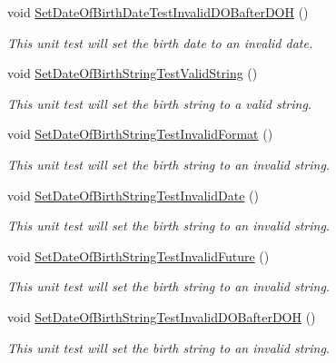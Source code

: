 \begin{DoxyCompactItemize}
void \hyperlink{class_my_all_employee_1_1_tests_1_1_full_time_employee_tests_a55349b1b82a2fa2317cfc5264117c39b}{Set\+Date\+Of\+Birth\+Date\+Test\+Invalid\+D\+O\+Bafter\+D\+O\+H} ()
\begin{DoxyCompactList}\small\item\em This unit test will set the birth date to an invalid date. \end{DoxyCompactList}\item 
void \hyperlink{class_my_all_employee_1_1_tests_1_1_full_time_employee_tests_a67f757b32c290ae433884bce57e33654}{Set\+Date\+Of\+Birth\+String\+Test\+Valid\+String} ()
\begin{DoxyCompactList}\small\item\em This unit test will set the birth string to a valid string. \end{DoxyCompactList}\item 
void \hyperlink{class_my_all_employee_1_1_tests_1_1_full_time_employee_tests_acea46d71cc386e8f83ec2d8d14e2e0ba}{Set\+Date\+Of\+Birth\+String\+Test\+Invalid\+Format} ()
\begin{DoxyCompactList}\small\item\em This unit test will set the birth string to an invalid string. \end{DoxyCompactList}\item 
void \hyperlink{class_my_all_employee_1_1_tests_1_1_full_time_employee_tests_a42006f31a8eef0684f11d335ce47d8c8}{Set\+Date\+Of\+Birth\+String\+Test\+Invalid\+Date} ()
\begin{DoxyCompactList}\small\item\em This unit test will set the birth string to an invalid string. \end{DoxyCompactList}\item 
void \hyperlink{class_my_all_employee_1_1_tests_1_1_full_time_employee_tests_a41513d1b83b5cc8380c5cd19d0ef45d7}{Set\+Date\+Of\+Birth\+String\+Test\+Invalid\+Future} ()
\begin{DoxyCompactList}\small\item\em This unit test will set the birth string to an invalid string. \end{DoxyCompactList}\item 
void \hyperlink{class_my_all_employee_1_1_tests_1_1_full_time_employee_tests_accc07c2a05da5a5c28d570cfc8a90bda}{Set\+Date\+Of\+Birth\+String\+Test\+Invalid\+D\+O\+Bafter\+D\+O\+H} ()
\begin{DoxyCompactList}\small\item\em This unit test will set the birth string to an invalid string. \end{DoxyCompactList}\item 

\end{DoxyCompactItemize}
